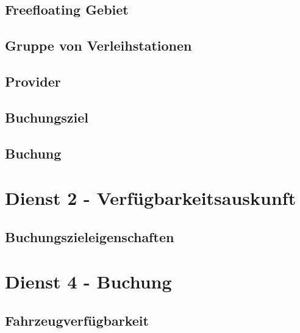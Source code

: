\subsection*{Freefloating Gebiet}



\subsection*{Gruppe von Verleihstationen}



\subsection*{Provider}



\subsection*{Buchungsziel}



\subsection*{Buchung}



\section{Dienst 2 - Verfügbarkeitsauskunft}
\label{sec:Datenmodell:Dienst2}

\subsection*{Buchungszieleigenschaften}




\section{Dienst 4 - Buchung}
\label{sec:Datenmodell:Dienst4}

\subsection*{Fahrzeugverfügbarkeit}




